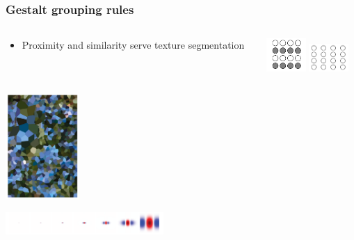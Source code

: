 \documentclass[]{beamer}
\begin{document}
\begin{frame}
\frametitle{Gestalt grouping rules}
\begin{overlayarea}{110mm}{80mm}
\begin{columns}[T]
\begin{column}{70mm}
\begin{center}
 \begin{itemize}
\setlength{\itemsep}{50pt}
 \item Proximity and similarity serve texture segmentation
\end{itemize}
\end{center}
\end{column}

 \begin{column}{30mm}
\begin{center}
\vspace{3mm}
\includegraphics[width=15mm]{figs/l5/gestalt_similarity.png}
\includegraphics[width=15mm]{figs/l5/gestalt_proximity.png}
\end{center}
 \end{column}
\end{columns}
\begin{center}
\includegraphics[height=40mm]{figs/l5/texture_segmentation.png}

\includegraphics[width=60mm]{figs/l5/odog_scales.png}
\end{center}
\end{overlayarea}
\end{frame}
\end{document}
